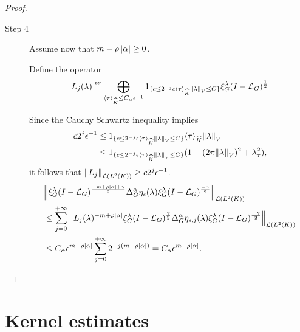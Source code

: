 \begin{proof}
\begin{description}
        \item [Step 4] Assume now that $m - \rho \abs \alpha \geq 0$.

            Define the operator
            \begin{align*}
                L_j(\lambda) \defeq \bigoplus_{\JapaneseBracket \CompactGroup \tau \leq C_\alpha \epsilon^{-1}} 1_{\{c \leq 2^{-j} \epsilon \JapaneseBracket \CompactGroup \tau \norm \lambda \leq C\}} \Rep \lambda \BesselPotential 1
            \end{align*}

            Since the Cauchy Schwartz inequality implies
            \begin{align*}
                c 2^{j} \epsilon^{-1}
                & \leq 1_{\{c \leq 2^{-j} \epsilon \JapaneseBracket \CompactGroup \tau \norm \lambda \leq C\}} \JapaneseBracket \CompactGroup \tau \norm \lambda\\
                & \leq 1_{\{c \leq 2^{-j} \epsilon \JapaneseBracket \CompactGroup \tau \norm \lambda \leq C\}} (1 + (\turn \norm \lambda)^2 + \lambda_\tau^2),
            \end{align*}
            it follows that $\norm [\Lin {\Lebesgue 2 \CompactGroup}] {L_j} \geq c 2^{j} \epsilon^{-1}$.
            \begin{align*}
                &\norm [\Lin {\Lebesgue 2 \CompactGroup}] {%
                    \Rep \lambda \BesselPotential {-m + \rho \abs\alpha + \gamma}
                    \DifferenceOperatorOrder \alpha \eta_\epsilon(\lambda)
                    \Rep \lambda \BesselPotential {-\gamma}
                }\\
                &\leq \sum_{j = 0}^{+\infty} \norm [\Lin {\Lebesgue 2 \CompactGroup}] {%
                    L_j(\lambda)^{-m + \rho \abs \alpha}
                    \Rep \lambda \BesselPotential \gamma
                    \DifferenceOperatorOrder \alpha \eta_{\epsilon, j}(\lambda)
                    \Rep \lambda \BesselPotential {-\gamma}
                }\\
                &\leq C_\alpha \epsilon^{m - \rho \abs \alpha} \sum_{j = 0}^{+\infty} 2^{-j(m - \rho \abs \alpha)}
                = C_\alpha \epsilon^{m - \rho \abs \alpha}.
            \end{align*}
    \end{description}
\end{proof}

\section{Kernel estimates}

